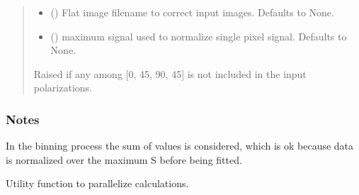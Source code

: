 \documentclass[letterpaper,10pt,english]{sphinxmanual}
\begin{document}
\begin{fulllineitems}
\begin{quote}
\begin{description}
\begin{itemize}
\item {} 
\sphinxAtStartPar
{} (\sphinxstyleliteralemphasis{\sphinxupquote{, }}) \textendash{} Flat image filename to correct input images. Defaults to None.

\item {} 
\sphinxAtStartPar
{} (\sphinxstyleliteralemphasis{\sphinxupquote{, }}) \textendash{} maximum signal used to normalize single pixel signal. Defaults to None.

\end{itemize}

\sphinxAtStartPar
{} \textendash{} Raised if any among {[}0, 45, 90, \sphinxhyphen{}45{]} is not included in the input polarizations.

\end{description}\end{quote}
\subsubsection*{Notes}

\sphinxAtStartPar
In the binning process the sum of values is considered, which is ok because data is normalized over the maximum S before being fitted.

\end{fulllineitems}


\begin{fulllineitems}
\label{\detokenize{micropolarray.processing:micropolarray.processing.demodulation.compute_demodulation_by_chunk}}
\pysigstartsignatures
{}
\pysigstopsignatures
\sphinxAtStartPar
Utility function to parallelize calculations.

\end{fulllineitems}
\end{document}
